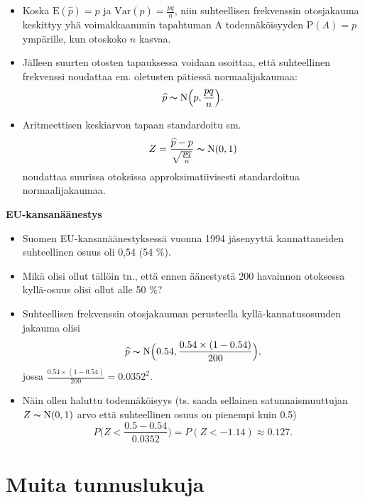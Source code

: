 \documentclass[
]{book}
\begin{document}
\begin{itemize}
\item
  Koska \(\text{E}(\widehat{p}) = p\) ja \(\mathrm{Var}(\widehat{p}) = \frac{pq}{n}\),
  niin suhteellisen frekvenssin otosjakauma keskittyy yhä voimakkaammin tapahtuman A
  todennäköisyyden \(\text{P}(A) = p\) ympärille, kun otoskoko \(n\) kasvaa.
\item
  Jälleen suurten otosten tapauksessa voidaan osoittaa, että suhteellinen frekvenssi noudattaa em. oletusten pätiessä normaalijakaumaa:
  \[
  \widehat{p} \thicksim \text{N} \Big(p, \frac{pq}{n} \Big).
  \]
\item
  Aritmeettisen keskiarvon tapaan standardoitu sm.
  \[
  Z = \frac{\widehat{p} - p}{\sqrt{\frac{pq}{n}}} \thicksim \text{N}(0,1)
  \]
  noudattaa suurissa otoksissa approksimatiivisesti standardoitua normaalijakaumaa.
\end{itemize}

\newpage

\begin{eblock}{}

\textbf{EU-kansanäänestys}

\begin{itemize}
\item
  Suomen EU-kansanäänestyksessä vuonna 1994 jäsenyyttä kannattaneiden suhteellinen osuus oli 0,54 (54 \%).
\item
  Mikä olisi ollut tällöin tn., että ennen äänestystä 200 havainnon otoksessa kyllä-osuus olisi ollut alle 50 \%?
\item
  Suhteellisen frekvenssin otosjakauman perusteella kyllä-kannatusosuuden jakauma olisi
  \[
  \widehat{p} \thicksim \text{N} \Big(0.54, \frac{0.54 \times (1-0.54)}{200} \Big),
  \]
  jossa \(\frac{0.54 \times (1-0.54)}{200} = 0.0352^2\).
\item
  Näin ollen haluttu todennäköisyys (ts. saada sellainen satunnaismuuttujan \(Z \thicksim \text{N}(0,1)\) arvo että suhteellinen osuus on pienempi kuin 0.5)
  \[
  P \Big(Z < \frac{0.5-0.54}{0.0352} \Big) = P (Z < -1.14) \approx 0.127.
  \]
\end{itemize}

\end{eblock}

\hypertarget{alaluku95}{%
\section{Muita tunnuslukuja}\label{alaluku95}}
\end{document}

